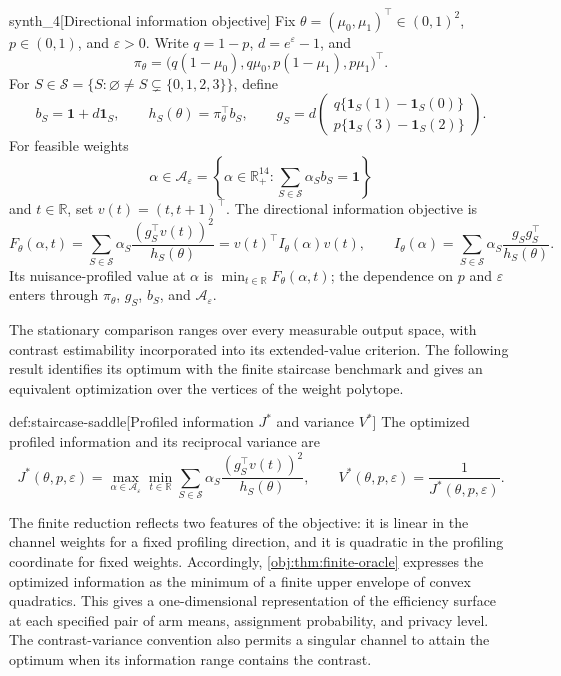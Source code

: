 \begin{definitionv}{synth_4}[Directional information objective]
Fix \(\theta=(\mu_0,\mu_1)^\top\in(0,1)^2\), \(p\in(0,1)\), and \(\varepsilon>0\). Write \(q=1-p\), \(d=e^\varepsilon-1\), and
\[
\pi_\theta=\bigl(q(1-\mu_0),q\mu_0,p(1-\mu_1),p\mu_1\bigr)^\top.
\]
For \(S\in\mathcal S=\{S:\varnothing\ne S\subsetneq\{0,1,2,3\}\}\), define
\[
b_S=\mathbf1+d\mathbf1_S,\qquad
h_S(\theta)=\pi_\theta^\top b_S,\qquad
g_S=d\begin{pmatrix}
q\{\mathbf1_S(1)-\mathbf1_S(0)\}\\
p\{\mathbf1_S(3)-\mathbf1_S(2)\}
\end{pmatrix}.
\]
For feasible weights
\[
\alpha\in\mathcal A_\varepsilon
=\left\{\alpha\in\mathbb R_+^{14}:
\sum_{S\in\mathcal S}\alpha_S b_S=\mathbf1\right\}
\]
and \(t\in\mathbb R\), set \(v(t)=(t,t+1)^\top\). The directional information objective is
\[
F_\theta(\alpha,t)
=\sum_{S\in\mathcal S}\alpha_S
\frac{(g_S^\top v(t))^2}{h_S(\theta)}
=v(t)^\top I_\theta(\alpha)v(t),
\qquad
I_\theta(\alpha)=
\sum_{S\in\mathcal S}\alpha_S\frac{g_Sg_S^\top}{h_S(\theta)}.
\]
Its nuisance-profiled value at \(\alpha\) is \(\min_{t\in\mathbb R}F_\theta(\alpha,t)\); the dependence on \(p\) and \(\varepsilon\) enters through \(\pi_\theta\), \(g_S\), \(b_S\), and \(\mathcal A_\varepsilon\).
\end{definitionv}

The stationary comparison ranges over every measurable output space, with contrast estimability incorporated into its extended-value criterion. The following result identifies its optimum with the finite staircase benchmark and gives an equivalent optimization over the vertices of the weight polytope.

\begin{definitionv}{def:staircase-saddle}[Profiled information $J^*$ and variance $V^*$]
The optimized profiled information and its reciprocal variance are
\[
J^*(\theta,p,\varepsilon)
=
\max_{\alpha\in\mathcal A_\varepsilon}
\min_{t\in\mathbb R}
\sum_{S\in\mathcal S}
\alpha_S\frac{(g_S^{\top}v(t))^2}{h_S(\theta)},
\qquad
V^*(\theta,p,\varepsilon)
=
\frac{1}{J^*(\theta,p,\varepsilon)}.
\]
\end{definitionv}

The finite reduction reflects two features of the objective: it is linear in the channel weights for a fixed profiling direction, and it is quadratic in the profiling coordinate for fixed weights. Accordingly, \cref{obj:thm:finite-oracle} expresses the optimized information as the minimum of a finite upper envelope of convex quadratics. This gives a one-dimensional representation of the efficiency surface at each specified pair of arm means, assignment probability, and privacy level. The contrast-variance convention also permits a singular channel to attain the optimum when its information range contains the contrast.

